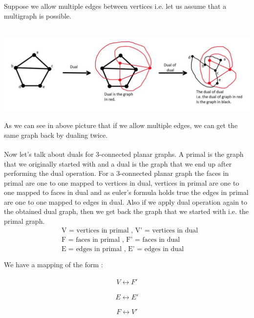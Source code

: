 \documentclass{article}
\begin{document}
    \\\\
    Suppose we allow multiple edges between vertices i.e. let us assume that a multigraph is possible.
    \\\\
    \centerline{\includegraphics[width=6in]{Images/dual_2.JPG}}
    As we can see in above picture that if we allow multiple edges, we can get the same graph back by dualing twice.
    \\\\
    Now let's talk about duals for 3-connected planar graphs. A primal is the graph that we originally started with and a dual is the graph that we end up after performing the dual operation. For a 3-connected planar graph the faces in primal are one to one mapped to vertices in dual, vertices in primal are one to one mapped to faces in dual and as euler's formula holds true the edges in primal are one to one mapped to edges in dual. Also if we apply dual operation again to the obtained dual graph, then we get back the graph that we started with i.e. the primal graph.
    \begin{align*}
        &\text{V = vertices in primal ,  V' = vertices in dual} \\
        &\text{F = faces in primal ,  F' = faces in dual} \\
        &\text{E = edges in primal ,    E' = edges in dual }\\\\
        \end{align*}
        We have a mapping of the form : \\\\
        \begin{equation}V \leftrightarrow F'     \end{equation}\\
        \begin{equation} E \leftrightarrow E' \end{equation} \\
        \begin{equation} F \leftrightarrow V' \end{equation}
\end{document}
